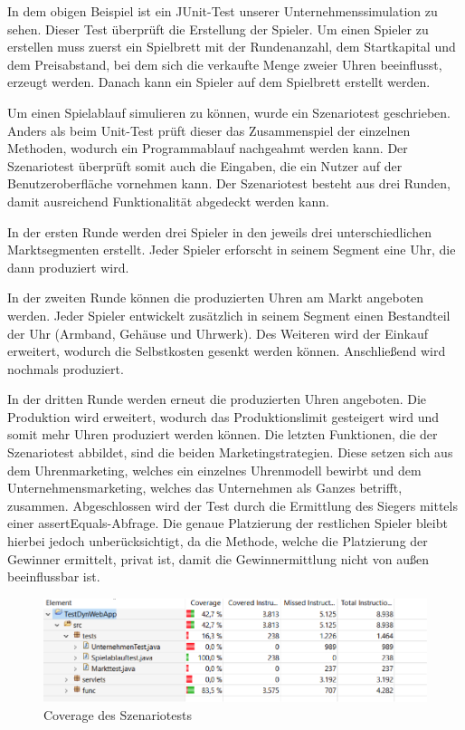 In dem obigen Beispiel ist ein JUnit-Test unserer Unternehmenssimulation zu sehen. Dieser Test überprüft die Erstellung der Spieler. Um einen Spieler zu erstellen muss zuerst ein Spielbrett mit der Rundenanzahl, dem Startkapital und dem Preisabstand, bei dem sich die verkaufte Menge zweier Uhren beeinflusst, erzeugt werden. Danach kann ein Spieler auf dem Spielbrett erstellt werden. 

Um einen Spielablauf simulieren zu können, wurde ein Szenariotest geschrieben. Anders als beim Unit-Test prüft dieser das Zusammenspiel der einzelnen Methoden, wodurch ein Programmablauf nachgeahmt werden kann. Der Szenariotest überprüft somit auch die Eingaben, die ein Nutzer auf der Benutzeroberfläche vornehmen kann.
Der Szenariotest besteht aus drei Runden, damit ausreichend Funktionalität abgedeckt werden kann. 


In der ersten Runde werden drei Spieler in den jeweils drei unterschiedlichen Marktsegmenten erstellt. Jeder Spieler erforscht in seinem Segment eine Uhr, die dann produziert wird. \par
In der zweiten Runde können die produzierten Uhren am Markt angeboten werden. Jeder Spieler entwickelt zusätzlich in seinem Segment einen Bestandteil der Uhr (Armband, Gehäuse und Uhrwerk). Des Weiteren wird der Einkauf erweitert, wodurch die Selbstkosten gesenkt werden können. Anschließend wird nochmals produziert.

In der dritten Runde werden erneut die produzierten Uhren angeboten. Die Produktion wird erweitert, wodurch das Produktionslimit gesteigert wird und somit mehr Uhren produziert werden können. Die letzten Funktionen, die der Szenariotest abbildet, sind die beiden Marketingstrategien. Diese setzen sich aus dem Uhrenmarketing, welches ein einzelnes Uhrenmodell bewirbt und dem Unternehmensmarketing, welches das Unternehmen als Ganzes betrifft, zusammen. 
Abgeschlossen wird der Test durch die Ermittlung des Siegers mittels einer assertEquals-Abfrage. Die genaue Platzierung der restlichen Spieler bleibt hierbei jedoch unberücksichtigt, da die Methode, welche die Platzierung der Gewinner ermittelt, privat ist, damit die Gewinnermittlung nicht von außen beeinflussbar ist. 

\begin{figure}[!h]
	\centering
	\includegraphics[scale=0.9]{img/bild1_tests.png} 
	\caption{Coverage des Szenariotests} \label{fig:abb31}
\end{figure}

